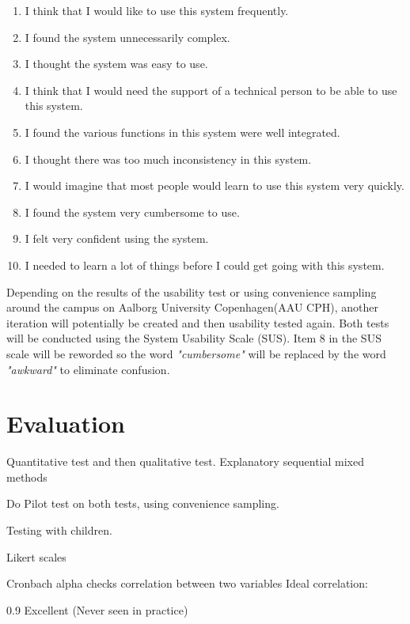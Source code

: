 \begin{enumerate} 
\item 	I think that I would like to use this system frequently.
\item 	I found the system unnecessarily complex.
\item 	I thought the system was easy to use.
\item 	I think that I would need the support of a technical person to be able to use this system.
\item 	I found the various functions in this system were well integrated.
\item 	I thought there was too much inconsistency in this system.
\item   I would imagine that most people would learn to use this system very quickly.
\item 	I found the system very cumbersome to use.
\item 	I felt very confident using the system.
\item 	I needed to learn a lot of things before I could get going with this system.
\end{enumerate} 

\par
 
  Depending on the results of the usability test or using convenience sampling around the campus on Aalborg University Copenhagen(AAU CPH), another iteration will potentially be created and then usability tested again. Both tests will be conducted using the System Usability Scale (SUS)\cite{susScale}. Item 8 in the SUS scale will be reworded so the word \textit{"cumbersome"} will be replaced by the word \textit{"awkward"} to eliminate confusion\cite{susScale}.
	
\section{Evaluation}
Quantitative test and then qualitative test.
Explanatory sequential mixed methods\cite[p.~21]{bjoernerBog}

Do Pilot test on both tests, using convenience sampling.

Testing with children\cite[p.~207]{bjoernerBog}.

Likert scales

Cronbach alpha checks correlation between two variables
Ideal correlation:

0.9 Excellent (Never seen in practice)

